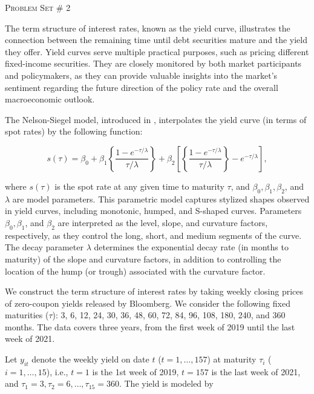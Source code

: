 \documentclass[12pt]{article}
\begin{document}
\null
\vspace{-1cm}
\begin{center}\LARGE \textsc{Problem Set} \# 2 \end{center}


The term structure of interest rates, known as the yield curve, illustrates the connection between the remaining time until debt securities mature and the yield they offer. Yield curves serve multiple practical purposes, such as pricing different fixed-income securities. They are closely monitored by both market participants and policymakers, as they can provide valuable insights into the market's sentiment regarding the future direction of the policy rate and the overall macroeconomic outlook.

The Nelson-Siegel model, introduced in \cite{nelson1987}, interpolates the yield curve (in terms of spot rates) by the following function:

\begin{equation}
    s(\tau) = \beta_0 + \beta_1 \left\{\frac{1 - e^{-\tau/\lambda}}{\tau/\lambda}\right\} + \beta_2 \left[\left\{\frac{1 - e^{-\tau/\lambda}}{\tau/\lambda}\right\} - e^{-\tau/\lambda} \right],
\end{equation}

where $s(\tau)$ is the spot rate at any given time to maturity $\tau$, and $\beta_0, \beta_1, \beta_2$, and $\lambda$ are model parameters. This parametric model captures stylized shapes observed in yield curves, including monotonic, humped, and S-shaped curves. Parameters $\beta_0, \beta_1$, and $\beta_2$ are interpreted as the level, slope, and curvature factors, respectively, as they control the long, short, and medium segments of the curve. The decay parameter $\lambda$ determines the exponential decay rate (in months to maturity) of the slope and curvature factors, in addition to controlling the location of the hump (or trough) associated with the curvature factor.

We construct the term structure of interest rates by taking weekly closing prices of zero-coupon yields released by Bloomberg. We consider the following fixed maturities ($\tau$): 3, 6, 12, 24, 30, 36, 48, 60, 72, 84, 96, 108, 180, 240, and 360 months. The data covers three years, from the first week of 2019 until the last week of 2021.

Let $y_{it}$ denote the weekly yield on date $t$ ($t = 1, \dots, 157$) at maturity $\tau_i$ ($i = 1, \dots, 15$), i.e., $t = 1$ is the 1st week of 2019, $t = 157$ is the last week of 2021, and $\tau_1 = 3, \tau_2 = 6, \dots, \tau_{15} = 360$. The yield is modeled by
\end{document}
